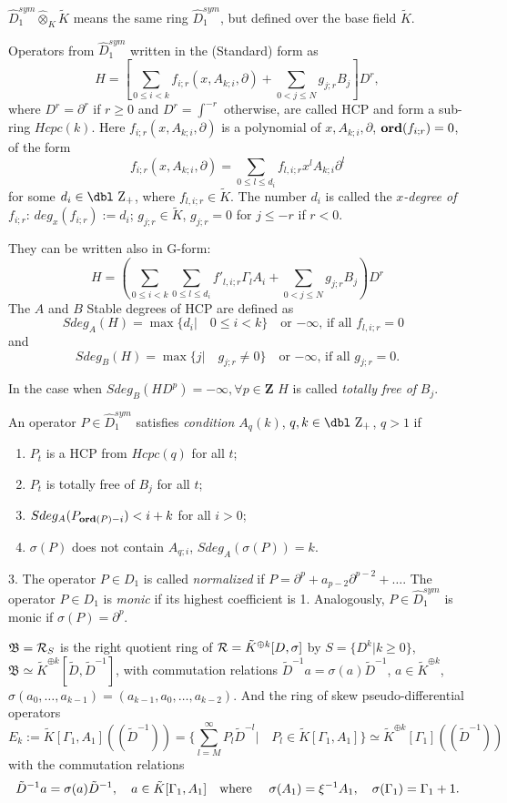 \documentclass[11pt]{article}
\theoremstyle{definition}
\newcommand{\dz}{{\mbox{\dbl Z}}}
\theoremstyle{plain}
\numberwithin{equation}{section}
\newcommand{\Ord}{\mathop {\rm \bf ord}}
\newcommand{\crr}{{{\cal R}}}
\begin{document}
$\hat{D}^{sym}_{1}\hat{\otimes}_{K}\tilde{K}$ means the same ring $\hat{D}^{sym}_{1}$, but defined over the base field $\tilde{K}$.

Operators from $\hat{D}_1^{sym}$ written in the (Standard) form as 
	$$
	H=[\sum_{0\leq i<k}f_{i;r}(x, A_{k;i}, \partial )+\sum_{0<j\leq N}g_{j;r}B_{j}]D^{r},
	$$
	where $D^r= \partial^r$ if $r\ge 0$ and $D^r= \int^{-r}$ otherwise, 
	are called HCP and  form a sub-ring $Hcpc(k)$. Here $f_{i;r}(x, A_{k;i}, \partial)$ is a polynomial of $x, A_{k;i},\partial$,  $\Ord(f_{i;r})=0$,  of the form
		$$
		f_{i;r}(x, A_{k;i}, \partial )=\sum_{0\leq l\leq d_{i}}f_{l,i;r}x^l A_{k;i}\partial^l
		$$
		for some $d_i\in \dz_+$, where $f_{l,i;r}\in \tilde{K}$. The number  $d_i$ is called the {\it $x$-degree of $f_{i;r}$}:  $deg_{x}(f_{i;r}):= d_i$; $g_{j;r}\in \tilde{K}$, $g_{j;r}=0$ for $j\le -r$ if $r<0$.
	
	They can be written also in G-form: 
	$$
	H=(\sum_{0\leq i<k}\sum_{0\leq l\leq d_i} f'_{l,i;r}\Gamma_lA_i+\sum_{0<j\leq N}g_{j;r}B_{j})D^{r}
	$$
	The $A$ and $B$ Stable degrees of HCP are defined as 
	$$
	Sdeg_A(H)=\max \{d_i|\quad 0\leq i<k \} \quad \mbox{or $-\infty$, if all $f_{l,i;r}=0$ } 
	$$
	and 
	$$Sdeg_B(H)=\max\{j|\quad g_{j;r}\neq0\} \quad \mbox{or $-\infty$, if all $g_{j;r}=0$}.
	$$
	
	
	In the case when $Sdeg_B(HD^p)=-\infty,\forall p\in \mathbf{Z}$ $H$ is called {\it totally free of} $B_j$.
	
	An operator $P\in  \hat{D}_1^{sym}$ satisfies {\it condition $A_q(k)$}, $q,k\in \dz_+$, $q>1$ if 
	\begin{enumerate}
		\item
		$P_{t}$ is a HCP  from $Hcpc (q)$  for all $t$;
		\item
		$P_{t}$ is totally free of $B_j$ for all $t$;
		\item
		$Sdeg_A(P_{\Ord (P)-i})< i+k$ for all $i>0$;
		\item
		$\sigma (P)$ does not contain $A_{q;i}$, $Sdeg_A(\sigma (P))=k$.
	\end{enumerate}

3. The operator $P\in D_1$ is called {\it normalized} if $P=\partial^p+a_{p-2}\partial^{p-2}+\ldots $. The operator $P\in D_1$ is {\it monic} if its highest coefficient is 1. Analogously, $P\in \hat{D}_1^{sym}$ is monic if $\sigma (P)=\partial^p$.  

 $\mathfrak{B}=\crr_S$ is the right quotient ring of $\crr = \tilde{K}^{\oplus k} [D,\sigma ]$ by $S=\{D^k|k\ge 0\}$, $\mathfrak{B}\simeq  \tilde{K}^{\oplus k}[\tilde{D}, \tilde{D}^{-1}]$, with commutation relations $\tilde{D}^{-1}a=\sigma (a)\tilde{D}^{-1}$, $a\in \tilde{K}^{\oplus k}$, $\sigma (a_0, \ldots ,a_{k-1})=(a_{k-1}, a_0, \ldots , a_{k-2})$. And the ring of skew pseudo-differential operators 
	$$
	E_k:=\tilde{K}[\Gamma_1, A_1]((\tilde{D}^{-1}))=\{\sum_{l=M}^{\infty}P_l\tilde{D}^{-l} | \quad P_l\in \tilde{K}[\Gamma_1, A_1]\} \simeq \tilde{K}^{\oplus k}[\Gamma_1]((\tilde{D}^{-1}))
	$$
with the commutation relations 
$$
\tilde{D}^{-1}a=\sigma (a)\tilde{D}^{-1}, \quad a\in \tilde{K}[\Gamma_1, A_1] \quad \mbox{where \quad }
\sigma (A_1)= \xi^{-1} A_1, \quad \sigma (\Gamma_1)=\Gamma_1+1.
$$	
	
\end{document}
